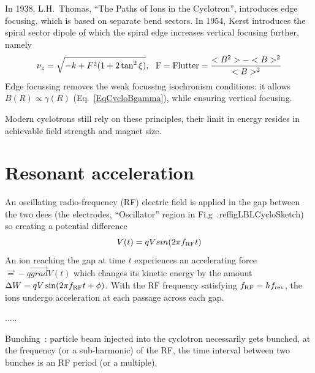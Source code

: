In 1938, L.H.~Thomas, ``The Paths of Ions in the Cyclotron'', 
introduces  edge focusing, which is based on separate bend sectors. 
In  1954, Kerst introduces the spiral sector dipole of which the spiral edge increases vertical focusing further, namely
\begin{equation}
\label{EqCycloThomasFoc}
\nu_z = \sqrt{-k + F^2(1 + 2 \tan^2 \xi)}, ~ ~ {\rm F=Flutter} = \frac{<B^2> - <B>^2}{<B>^2}
\end{equation}
Edge focussing removes the weak focussing isochronism conditions: it allows  $B(R)\propto\gamma(R)$ 
 (Eq.~\ref{EqCycloBgamma}), while  ensuring vertical focusing.  

  Modern cyclotrons still  rely on these principles,
their limit in energy resides in achievable field strength and magnet size. 



\section{Resonant acceleration \label{secCycloClassAccel}}

An oscillating radio-frequency (RF) electric field 
is applied in the gap between the two dees (the electrodes, 
 ``Oscillator'' region in Fi.g~.ref{figLBLCycloSketch})
so creating a potential difference 
\begin{equation}
\label{EqRFCyclo}
 V(t) = qV sin(2\pi f_{\rm RF}t)
\end{equation}
An  ion reaching the gap at time $t$  experiences an accelerating force $\vec = -q \vec{grad}V(t)$ which changes 
its  kinetic energy by the amount $\Delta W = q V \sin(2\pi f_{\rm RF}t + \phi)$. 
With the  RF frequency satisfying $f_{\rm RF} = h f_{\rm rev}$,   the ions undergo acceleration at each passage across each gap. 


.....

     Bunching~: particle beam injected into the cyclotron necessarily gets bunched, at the 
frequency (or a sub-harmonic) of the RF, 
the time interval between two bunches is an RF period (or a multiple).




